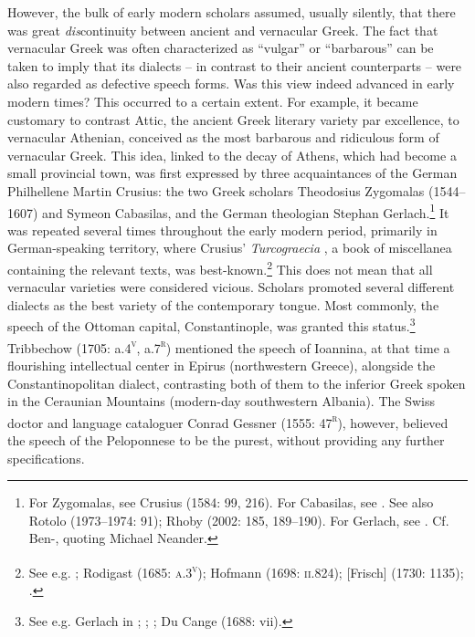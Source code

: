 \documentclass[output=paper]{langsci/langscibook}
\begin{document}
However, the bulk of early modern scholars assumed, usually silently, that there was great \textit{dis}continuity between ancient and vernacular Greek. The fact that vernacular Greek was often characterized as “vulgar” or “barbarous” can be taken to imply that its dialects – in contrast to their ancient counterparts – were also regarded as defective speech forms. Was this view indeed advanced in early modern times? This occurred to a certain extent. For example, it became customary to contrast Attic, the ancient Greek literary variety par excellence, to vernacular Athenian, conceived as the most barbarous and ridiculous form of vernacular Greek. This idea, linked to the decay of Athens, which had become a small provincial town, was first expressed by three acquaintances of the German Philhellene Martin Crusius: the two Greek scholars Theodosius Zygomalas (1544–1607) and Symeon Cabasilas, and the German theologian Stephan Gerlach.\footnote{For Zygomalas, see Crusius (1584: 99, 216). For Cabasilas, see \citet[461]{Crusius1584}. See also Rotolo (1973–1974: 91); Rhoby (2002: 185, 189–190). For Gerlach, see \citet[489]{Crusius1584}. Cf. Ben-\citet[194]{Tov2013}, quoting Michael Neander.} It was repeated several times throughout the early modern period, primarily in German-speaking territory, where Crusius’ \textit{Turcograecia} , a book of miscellanea containing the relevant texts, was best-known.\footnote{See e.g. \citet[215]{Becman1673}; Rodigast (1685: \textsc{a.3}\textsc{\textsuperscript{v}}); Hofmann (1698: \textsc{ii}.824); [Frisch] (1730: 1135); \citet[9]{Gedike1782}.} This does not mean that all vernacular varieties were considered vicious. Scholars promoted several different dialects as the best variety of the contemporary tongue. Most commonly, the speech of the Ottoman capital, Constantinople, was granted this status.\footnote{See e.g. Gerlach in \citet[489]{Crusius1584}; \citet[215]{Becman1673}; \citet[74]{Blount1680}; Du Cange (1688: vii).} Tribbechow (1705: a.4\textsc{\textsuperscript{v}}, a.7\textsc{\textsuperscript{r}}) mentioned the speech of Ioannina, at that time a flourishing intellectual center in Epirus (northwestern Greece), alongside the Constantinopolitan dialect, contrasting both of them to the inferior Greek spoken in the Ceraunian Mountains (modern-day southwestern Albania). The Swiss doctor and language cataloguer Conrad Gessner (1555: 47\textsc{\textsuperscript{r}}), however, believed the speech of the Peloponnese to be the purest, without providing any further specifications.
\end{document}
